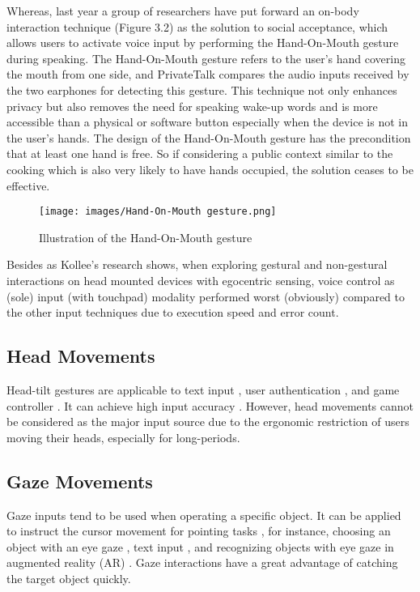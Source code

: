\documentclass[fyp]{socreport}
\begin{document}
Whereas, last year a group of researchers \cite{yan2019privatetalk} have put forward an on-body interaction technique (Figure 3.2) as the solution to social acceptance, which allows users to activate voice input by performing the Hand-On-Mouth gesture during speaking. The Hand-On-Mouth gesture refers to the user’s hand covering the mouth from one side, and PrivateTalk compares the audio inputs received by the two earphones for detecting this gesture. This technique not only enhances privacy but also removes the need for speaking wake-up words and is more accessible than a physical or software button especially when the device is not in the user's hands. The design of the Hand-On-Mouth gesture has the precondition that at least one hand is free. So if considering a public context similar to the cooking which is also very likely to have hands occupied, the solution ceases to be effective.

\begin{figure}[H]
\caption{Illustration of the Hand-On-Mouth gesture}
\centering
\texttt{[image: images/Hand-On-Mouth gesture.png]}
\end{figure}

Besides as Kollee's research \cite{kollee2014exploring} shows, when exploring gestural and non-gestural interactions on head mounted devices with egocentric sensing, voice control as (sole) input (with touchpad) modality performed worst (obviously) compared to the other input techniques due to execution speed and error count. 

\subsection{Head Movements}

Head-tilt gestures are applicable to text input \cite{jones2010gestext}, user authentication \cite{yi2016glassgesture}, and game controller \cite{wahl2015using}. It can achieve high input accuracy \cite{yi2016glassgesture}. However, head movements cannot be considered as the major input source due to the ergonomic restriction of users moving their heads, especially for long-periods.

\subsection{Gaze Movements}
Gaze inputs tend to be used when operating a specific object. It can be applied to instruct the cursor movement for pointing tasks \cite{wahl2015using}, for instance, choosing an object with an eye gaze \cite{slambekova2012gaze}, text input \cite{tuisku2008now}, and recognizing objects with eye gaze in augmented reality (AR) \cite{toyama2012gaze}. Gaze interactions have a great advantage of catching the target object quickly. 
\end{document}
